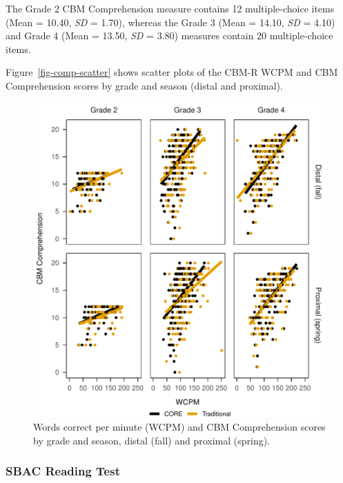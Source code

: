 \documentclass[
  english,
  man, fleqn, noextraspace]{apa6}
\begin{document}
The Grade 2 CBM Comprehension measure contains 12 multiple-choice items (Mean = 10.40, \emph{SD} = 1.70), whereas the Grade 3 (Mean = 14.10, \emph{SD} = 4.10) and Grade 4 (Mean = 13.50, \emph{SD} = 3.80) measures contain 20 multiple-choice items.

Figure~\ref{fig-comp-scatter} shows scatter plots of the CBM-R WCPM and CBM Comprehension scores by grade and season (distal and proximal).



\begin{figure}
\centering
\includegraphics{conseq_validity_manusript_files/figure-latex/fig-comp-scatter-1.pdf}
\caption{\label{fig:fig-comp-scatter}Words correct per minute (WCPM) and CBM Comprehension scores by grade and season, distal (fall) and proximal (spring).}
\end{figure}

\hypertarget{sbac-reading-test}{%
\subsubsection{SBAC Reading Test}\label{sbac-reading-test}}
\end{document}
